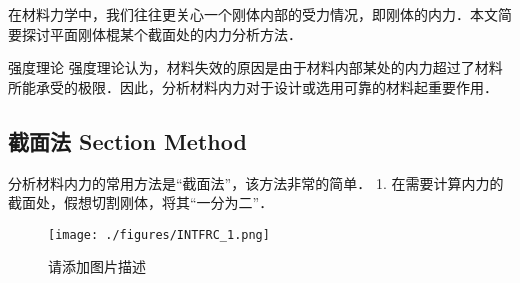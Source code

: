 
在材料力学中，我们往往更关心一个刚体内部的受力情况，即刚体的内力．本文简要探讨平面刚体棍某个截面处的内力分析方法．

\begin{example}{强度理论}
强度理论认为，材料失效的原因是由于材料内部某处的内力超过了材料所能承受的极限．因此，分析材料内力对于设计或选用可靠的材料起重要作用．
\end{example}

\subsection{截面法 Section Method}
分析材料内力的常用方法是“截面法”，该方法非常的简单．
1. 在需要计算内力的截面处，假想切割刚体，将其“一分为二”．
\begin{figure}[ht]
\centering
\texttt{[image: ./figures/INTFRC\_1.png]}
\caption{请添加图片描述} \label{INTFRC_fig1}
\end{figure}